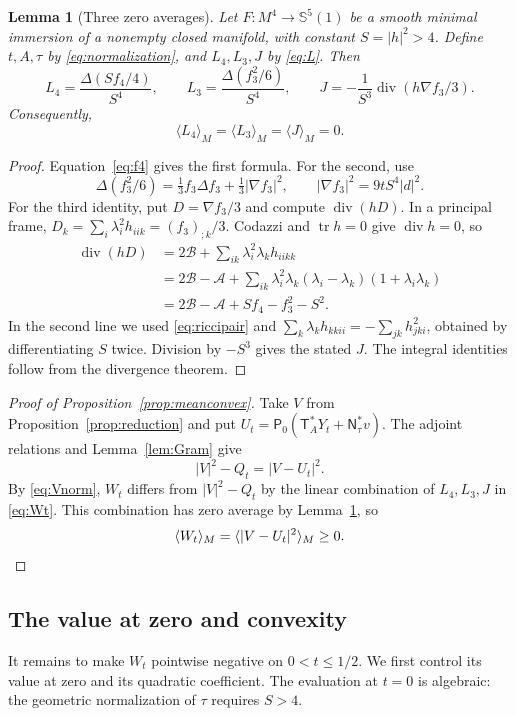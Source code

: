 \documentclass[11pt,a4paper]{amsart}
\numberwithin{equation}{section}
\newtheorem{lemma}[theorem]{Lemma}
\theoremstyle{definition}
\theoremstyle{remark}
\DeclareMathOperator{\tr}{tr}
\DeclareMathOperator{\diver}{div}
\newcommand{\Sph}{\mathbb S}
\newcommand{\T}{\mathsf T}
\newcommand{\N}{\mathsf N}
\newcommand{\Pz}{\mathsf P_0}
\newcommand{\av}[1]{\langle #1\rangle_M}
\begin{document}
\begin{lemma}[Three zero averages]\label{lem:mean}
Let $F:M^4\to\Sph^5(1)$ be a smooth minimal immersion of a nonempty
closed manifold, with constant $S=|h|^2>4$. Define $t,A,\tau$ by
\eqref{eq:normalization}, and $L_4,L_3,J$ by \eqref{eq:L}. Then
\begin{equation}\label{eq:divergences}
 L_4=\frac{\Delta(Sf_4/4)}{S^4},\qquad
 L_3=\frac{\Delta(f_3^2/6)}{S^4},\qquad
 J=-\frac1{S^3}\diver(h\nabla f_3/3).
\end{equation}
Consequently,
\[
 \av{L_4}=\av{L_3}=\av J=0.
\]
\end{lemma}
\begin{proof}
Equation~\eqref{eq:f4} gives the first formula. For the second, use
\[
 \Delta(f_3^2/6)=\tfrac13f_3\Delta f_3+\tfrac13|\nabla f_3|^2,
 \qquad |\nabla f_3|^2=9tS^4|d|^2.
\]
For the third identity, put $D=\nabla f_3/3$ and compute $\diver(hD)$.
In a principal frame, $D_k=\sum_i\lambda_i^2h_{iik}=(f_3)_{;k}/3$.
Codazzi and $\tr h=0$ give $\diver h=0$, so
\begin{align*}
 \diver(hD)
 &=2\mathcal B+\sum_{ik}\lambda_i^2\lambda_k h_{iikk}\\
 &=2\mathcal B-\mathcal A
   +\sum_{ik}\lambda_i^2\lambda_k(\lambda_i-\lambda_k)
                                  (1+\lambda_i\lambda_k)\\
 &=2\mathcal B-\mathcal A+Sf_4-f_3^2-S^2.
\end{align*}
In the second line we used \eqref{eq:riccipair} and
$\sum_k\lambda_kh_{kkii}=-\sum_{jk}h_{jki}^2$, obtained by
differentiating $S$ twice. Division by $-S^3$ gives the stated $J$.
The integral identities follow from the divergence theorem.
\end{proof}

\begin{proof}[Proof of Proposition~\ref{prop:meanconvex}]
Take $V$ from Proposition~\ref{prop:reduction} and put
$U_t=\Pz(\T_A^*Y_t+\N_\tau^*v)$. The adjoint relations and
Lemma~\ref{lem:Gram} give
\[
 |V|^2-Q_t=|V-U_t|^2.
\]
By \eqref{eq:Vnorm}, $W_t$ differs from $|V|^2-Q_t$ by the
linear combination of $L_4,L_3,J$ in \eqref{eq:Wt}.
This combination has zero average by Lemma~\ref{lem:mean}, so
\[
 \av{W_t}=\av{|V-U_t|^2}\ge0.\qedhere
\]
\end{proof}

\subsection{The value at zero and convexity}
It remains to make $W_t$ pointwise negative on $0<t\le1/2$.
We first control its value at zero and its quadratic coefficient.
The evaluation at $t=0$ is algebraic: the geometric
normalization of $\tau$ requires $S>4$.
\end{document}
